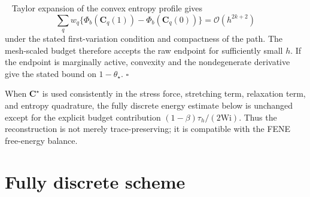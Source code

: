 ﻿\documentclass[11pt]{amsart}
\newcommand{\CC}{\bm C}
\newcommand{\Wi}{\mathrm{Wi}}
\newcommand{\calO}{\mathcal O}
\renewenvironment{proof}{\par\medskip\noindent{\itshape Proof.}\ }{\hfill$\square$\par\medskip}
\begin{document}
\begin{proof}
Taylor expansion of the convex entropy profile gives
\[
  \sum_qw_q\{\Phi_b(\CC_q(1))-\Phi_b(\CC_q(0))\}
  =
  \calO(h^{2k+2})
\]
under the stated first-variation condition and compactness of the path.  The mesh-scaled budget therefore accepts the raw endpoint for sufficiently small $h$.  If the endpoint is marginally active, convexity and the nondegenerate derivative give the stated bound on $1-\theta_\star$.
\end{proof}

When $\CC^\star$ is used consistently in the stress force, stretching term, relaxation term, and entropy quadrature, the fully discrete energy estimate below is unchanged except for the explicit budget contribution $(1-\beta)\tau_h/(2\Wi)$.  Thus the reconstruction is not merely trace-preserving; it is compatible with the FENE free-energy balance.

\section{Fully discrete scheme}
\end{document}
